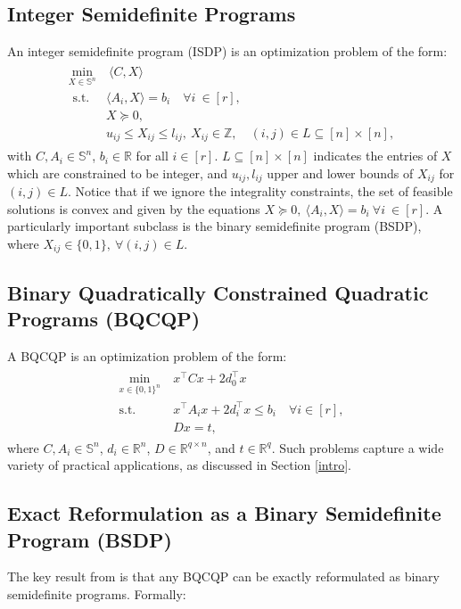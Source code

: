 \documentclass{article}
\begin{document}
\subsection{Integer Semidefinite Programs}
An integer semidefinite program (ISDP) is an optimization problem of the form:
\begin{gather}\label{ISDP}\tag{ISDP}
\begin{aligned}
\min_{X \in \mathbb{S}^n }  & \  \langle  C,X\rangle \\
\text{ s.t. } & \langle A_i,X  \rangle = b_i  \quad \forall i \ \in [r],  \\
 & X \succeq 0, \\
& u_{ij} \leq X_{ij} \leq l_{ij} ,\  X_{ij}\in \mathbb{Z},   \quad (i,j)\in L\subseteq [n]\times[n],
\end{aligned}
\end{gather}
with $C,A_i \in \mathbb{S}^n$, $b_i \in \mathbb{R}$ for all $i \in [r]$.
$L\subseteq [n]\times[n]$ indicates the entries of $X$ which are constrained to be integer, and  $u_{ij},l_{ij}$ upper and lower bounds of $X_{ij}$ for $(i,j) \in L$. Notice that if we ignore the integrality constraints, the set of feasible solutions is convex and given by the equations
$ X \succeq 0, \ \langle A_i,X \rangle = b_i  \ \forall i \ \in [r]$.
A particularly important subclass is the binary semidefinite program (BSDP), where
$
X_{ij} \in \{0,1\}, \ \forall (i,j) \in L.
$

\subsection{Binary Quadratically Constrained Quadratic Programs (BQCQP)}
A BQCQP is an optimization problem of the form:
\begin{gather}\label{BQCQP}\tag{BQCQP}
\begin{aligned}
\min_{x \in \{0,1\}^n} & \  x^\top C x + 2d_0^\top x \\
\text{s.t.} & \ x^\top A_i x + 2d_i^\top x \leq b_i \quad \forall i \in [r], \\
& \ Dx = t,
\end{aligned}
\end{gather}
where $C, A_i \in \mathbb{S}^n$, $d_i \in \mathbb{R}^n$, $D \in \mathbb{R}^{q\times n}$, and $t \in \mathbb{R}^q$. Such problems capture a wide variety of practical applications, as discussed in Section \ref{intro}.

\subsection{Exact Reformulation as a Binary Semidefinite Program (BSDP)}
The key result from \cite{de2023integrality} is that any BQCQP can be exactly reformulated as binary semidefinite programs. Formally:
\end{document}
